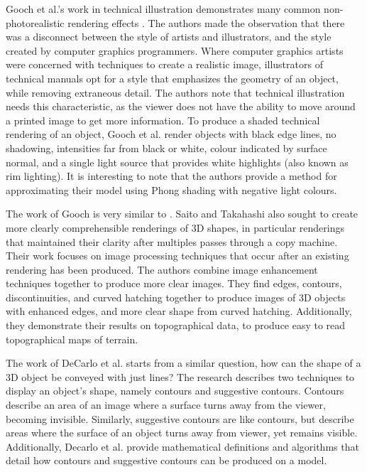 Gooch et al.'s work in technical illustration demonstrates many common non-photorealistic 
rendering effects \cite{gooch98}. The authors made the observation that there was a 
disconnect between the style of artists and illustrators, and the style created by computer 
graphics programmers. Where computer graphics artists were concerned with techniques to 
create a realistic image, illustrators of technical manuals opt for a style that emphasizes
the geometry of an object, while removing extraneous detail. The authors note that technical
illustration needs this characteristic, as the viewer does not have the ability to move
around a printed image to get more information. To produce a shaded technical rendering of
an object, Gooch et al. render objects with black edge lines, no shadowing, intensities far 
from black or white, colour indicated by surface normal, and a single light source that 
provides white highlights (also known as rim lighting). It is interesting to note that the 
authors provide a method for approximating their model using Phong shading with negative 
light colours.

The work of Gooch is very similar to \cite{saito90}. Saito and Takahashi also sought to create
more clearly comprehensible renderings of 3D shapes, in particular renderings that maintained
their clarity after multiples passes through a copy machine. Their work focuses on image 
processing techniques that occur after an existing rendering has been produced. The authors 
combine image enhancement techniques together to produce more clear images. They find edges, 
contours, discontinuities, and curved hatching together to produce images of 3D objects with
enhanced edges, and more clear shape from curved hatching. Additionally, they demonstrate
their results on topographical data, to produce easy to read topographical maps of terrain.

The work of DeCarlo et al. starts from a similar question, how can the shape of a 3D object be
conveyed with just lines\cite{decarlo03}? The research describes two techniques to display 
an object's shape, namely contours and suggestive contours. Contours describe an area of an 
image where a surface turns away from the viewer, becoming invisible. Similarly, suggestive
contours are like contours, but describe areas where the surface of an object turns away from
viewer, yet remains visible. Additionally, Decarlo et al. provide mathematical definitions
and algorithms that detail how contours and suggestive contours can be produced on a model.

